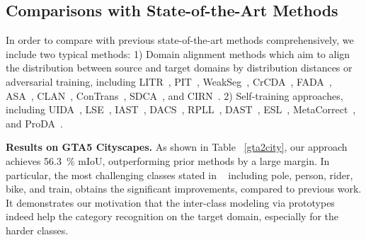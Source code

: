 \documentclass[runningheads]{llncs}
\begin{document}
\subsection{Comparisons with State-of-the-Art Methods}

In order to compare with previous state-of-the-art methods comprehensively, we include two typical methods: 1) Domain alignment methods which aim to align the distribution between source and target domains by distribution distances or adversarial training, including LITR~\cite{kim2020learning}, PIT~\cite{lv2020cross}, WeakSeg~\cite{paul2020domain}, CrCDA~\cite{huang2020contextual}, FADA~\cite{wang2020classes}, ASA~\cite{zhou2020affinity}, CLAN~\cite{luo2021category}, ConTrans~\cite{lee2020unsupervised}, SDCA~\cite{li2021semantic}, and CIRN~\cite{gao2021addressing}. 2) Self-training approaches, including UIDA~\cite{pan2020unsupervised}, LSE~\cite{subhani2020learning}, IAST~\cite{mei2020instance}, DACS~\cite{tranheden2021dacs}, RPLL~\cite{zheng2021rectifying}, DAST~\cite{yu2021dast}, ESL~\cite{saporta2020esl}, MetaCorrect~\cite{guo2021metacorrection}, and ProDA~\cite{zhang2021prototypical}.

\noindent \textbf{Results on GTA5  Cityscapes.}  As shown in Table ~\ref{gta2city}, our approach achieves 56.3~\% mIoU, outperforming prior methods by a large margin. In particular, the most challenging classes stated in ~\cite{li2021semantic} including pole, person, rider, bike, and train, obtains the significant improvements, compared to previous work. It demonstrates our motivation that the inter-class modeling via prototypes indeed help the category recognition on the target domain, especially for the harder classes. 
\end{document}
